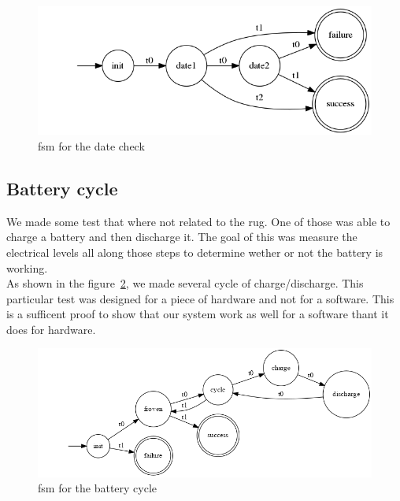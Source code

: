 \documentclass[12pt]{article}
\begin{document}
\begin{figure}
    \centering
    \includegraphics[scale=0.6]{graph/DateCheck}
    \caption{\gls{fsm} for the date check}
    \label{datecheck}
\end{figure}

\subsection{Battery cycle}

We made some test that where not related to the \gls{rug}. One of those was able to charge a battery and then discharge it. The goal of this was measure the electrical levels all along those steps to determine wether or not the battery is working.\\

As shown in the figure~\ref{battcycle2}, we made several cycle of charge/discharge. This particular test was designed for a piece of hardware and not for a software. This is a sufficent proof to show that our system work as well for a software thant it does for hardware.

\begin{figure}
    \centering
    \includegraphics[scale=0.4]{graph/BatteryCycle.png}
    \caption{\gls{fsm} for the battery cycle}
    \label{battcycle2}
\end{figure}

\clearpage
{}

{}

\clearpage
\printglossaries
\end{document}
